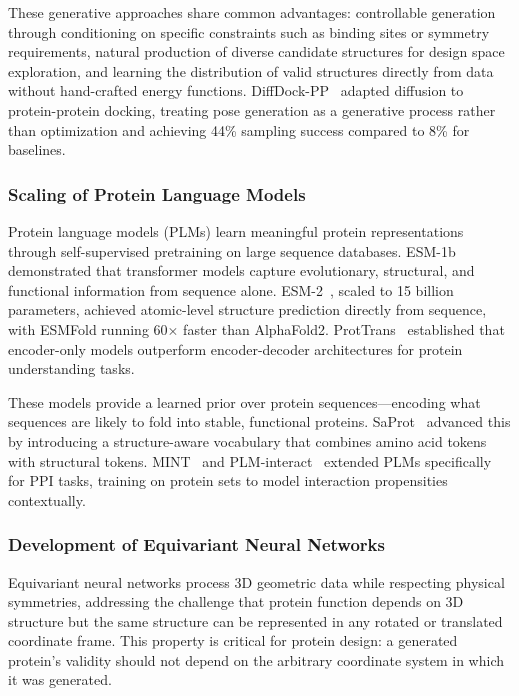 These generative approaches share common advantages: controllable generation through conditioning on specific constraints such as binding sites or symmetry requirements, natural production of diverse candidate structures for design space exploration, and learning the distribution of valid structures directly from data without hand-crafted energy functions. DiffDock-PP~\citep{ketata2023diffdockpp} adapted diffusion to protein-protein docking, treating pose generation as a generative process rather than optimization and achieving 44\% sampling success compared to 8\% for baselines.

\subsubsection{Scaling of Protein Language Models}

Protein language models (PLMs) learn meaningful protein representations through self-supervised pretraining on large sequence databases. ESM-1b~\citep{rives2021esm1b} demonstrated that transformer models capture evolutionary, structural, and functional information from sequence alone. ESM-2~\citep{lin2023esm2}, scaled to 15 billion parameters, achieved atomic-level structure prediction directly from sequence, with ESMFold running 60$\times$ faster than AlphaFold2. ProtTrans~\citep{elnaggar2021prottrans} established that encoder-only models outperform encoder-decoder architectures for protein understanding tasks.

These models provide a learned prior over protein sequences---encoding what sequences are likely to fold into stable, functional proteins. SaProt~\citep{su2024saprot} advanced this by introducing a structure-aware vocabulary that combines amino acid tokens with structural tokens. MINT~\citep{ullanat2025mint} and PLM-interact~\citep{zhao2025plminteract} extended PLMs specifically for PPI tasks, training on protein sets to model interaction propensities contextually.

\subsubsection{Development of Equivariant Neural Networks}

Equivariant neural networks process 3D geometric data while respecting physical symmetries, addressing the challenge that protein function depends on 3D structure but the same structure can be represented in any rotated or translated coordinate frame. This property is critical for protein design: a generated protein's validity should not depend on the arbitrary coordinate system in which it was generated.

